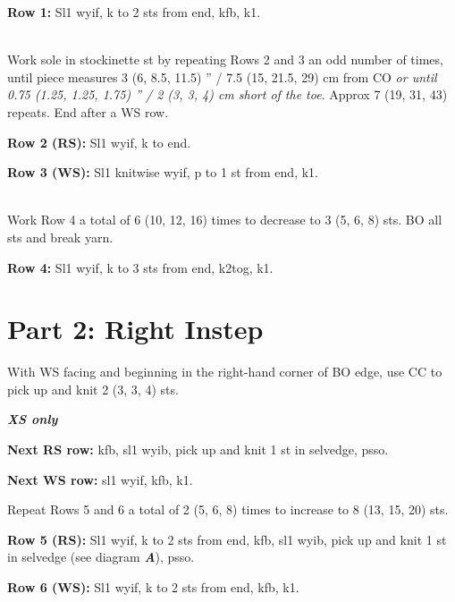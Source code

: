 \documentclass[12pt]{article}
\newcommand{\vocab}[1]{\emph{\textbf{#1}}} %
\newcommand{\rowDir}[1]{\textbf{#1:}} %
\newcommand{\adjustment}[1]{\emph{#1}} %
\newenvironment{frdirection}
    {%
	\def\FrameCommand{\fboxrule=\FrameRule\fboxsep=\FrameSep \fbox}
   	\MakeFramed {\advance\hsize-\width \FrameRestore}
    	\addmargin[2em]{0pt}}
    {\endaddmargin
	\endMakeFramed}
\begin{document}
\rowDir{Row 1} Sl1 wyif, k to 2 sts from end, kfb, k1.

~\\
Work sole in stockinette st by repeating Rows 2 and 3 an odd number of times, until piece measures 3 (6, 8.5, 11.5) ” / 7.5 (15, 21.5, 29) cm from CO \adjustment{or until 0.75 (1.25, 1.25, 1.75) ” / 2 (3, 3, 4) cm short of the toe}. Approx 7 (19, 31, 43) repeats. End after a WS row.

\rowDir{Row 2 (RS)} Sl1 wyif, k to end.

\rowDir{Row 3 (WS)} Sl1 knitwise wyif, p to 1 st from end, k1.

~\\
Work Row 4 a total of 6 (10, 12, 16) times to decrease to 3 (5, 6, 8) sts. BO all sts and break yarn.

\rowDir{Row 4} Sl1 wyif, k to 3 sts from end, k2tog, k1.

\section*{Part 2: Right Instep}

With WS facing and beginning in the right-hand corner of BO edge, use CC to pick up and knit 2 (3, 3, 4) sts.

\begin{frdirection}
\hspace{-2em}\vocab{XS only}

\rowDir{Next RS row} kfb, sl1 wyib, pick up and knit 1 st in selvedge, psso.

\rowDir{Next WS row} sl1 wyif, kfb, k1.
\end{frdirection}

Repeat Rows 5 and 6 a total of 2 (5, 6, 8) times to increase to 8 (13, 15, 20) sts.

\rowDir{Row 5 (RS)} Sl1 wyif, k to 2 sts from end, kfb, sl1 wyib, pick up and knit 1 st in selvedge (see diagram \vocab{A}), psso.

\rowDir{Row 6 (WS)} Sl1 wyif, k to 2 sts from end, kfb, k1.
\end{document}
